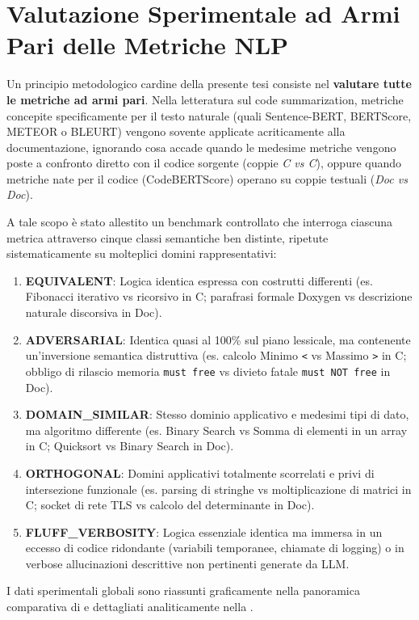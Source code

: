 \section{Valutazione Sperimentale ad Armi Pari delle Metriche NLP}
\label{sec:valutazione_armi_pari_nlp}

Un principio metodologico cardine della presente tesi consiste nel \textbf{valutare tutte le metriche ad armi pari}. Nella letteratura sul code summarization, metriche concepite specificamente per il testo naturale (quali Sentence-BERT, BERTScore, METEOR o BLEURT) vengono sovente applicate acriticamente alla documentazione, ignorando cosa accade quando le medesime metriche vengono poste a confronto diretto con il codice sorgente (coppie \emph{C vs C}), oppure quando metriche nate per il codice (CodeBERTScore) operano su coppie testuali (\emph{Doc vs Doc}).

A tale scopo è stato allestito un benchmark controllato che interroga ciascuna metrica attraverso cinque classi semantiche ben distinte, ripetute sistematicamente su molteplici domini rappresentativi:
\begin{enumerate}
    \item \textbf{EQUIVALENT}: Logica identica espressa con costrutti differenti (es. Fibonacci iterativo vs ricorsivo in C; parafrasi formale Doxygen vs descrizione naturale discorsiva in Doc).
    \item \textbf{ADVERSARIAL}: Identica quasi al 100\% sul piano lessicale, ma contenente un'inversione semantica distruttiva (es. calcolo Minimo \texttt{<} vs Massimo \texttt{>} in C; obbligo di rilascio memoria \texttt{must free} vs divieto fatale \texttt{must NOT free} in Doc).
    \item \textbf{DOMAIN\_SIMILAR}: Stesso dominio applicativo e medesimi tipi di dato, ma algoritmo differente (es. Binary Search vs Somma di elementi in un array in C; Quicksort vs Binary Search in Doc).
    \item \textbf{ORTHOGONAL}: Domini applicativi totalmente scorrelati e privi di intersezione funzionale (es. parsing di stringhe vs moltiplicazione di matrici in C; socket di rete TLS vs calcolo del determinante in Doc).
    \item \textbf{FLUFF\_VERBOSITY}: Logica essenziale identica ma immersa in un eccesso di codice ridondante (variabili temporanee, chiamate di logging) o in verbose allucinazioni descrittive non pertinenti generate da LLM.
\end{enumerate}

I dati sperimentali globali sono riassunti graficamente nella panoramica comparativa di  e dettagliati analiticamente nella .

